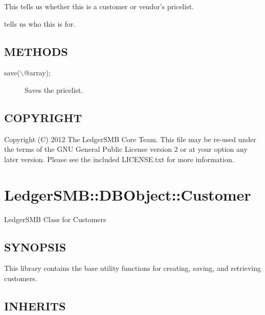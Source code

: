 \begin{description}
\begin{description}
\begin{description}
\begin{description}
\begin{description}
\begin{description}
\begin{description}
\begin{description}
\begin{description}
\begin{description}
\begin{description}
This tells us whether this is a customer or vendor's pricelist.


\item[{credit\_id}] \mbox{}

tells us who this is for.

\end{description}
\subsection*{METHODS\label{LedgerSMB::DBObject::Pricelist_METHODS}}
\begin{description}

\item[{save($\backslash$@array);}] \mbox{}

Saves the pricelist.

\end{description}
\subsection*{COPYRIGHT\label{LedgerSMB::DBObject::Pricelist_COPYRIGHT}}


Copyright (C) 2012 The LedgerSMB Core Team.  This file may be re-used under the
terms of the GNU General Public License version 2 or at your option any later
version.  Please see the included LICENSE.txt for more information.

\section{LedgerSMB::DBObject::Customer\label{LedgerSMB::DBObject::Customer}}


LedgerSMB Class for Customers

\subsection*{SYNOPSIS\label{LedgerSMB::DBObject::Customer_SYNOPSIS}}


This library contains the base utility functions for creating, saving, and
retrieving customers.

\subsection*{INHERITS\label{LedgerSMB::DBObject::Customer_INHERITS}}



\end{description}
\end{description}
\end{description}
\end{description}
\end{description}
\end{description}
\end{description}
\end{description}
\end{description}
\end{description}
